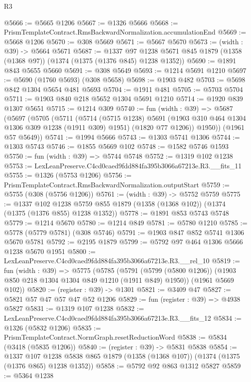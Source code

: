\begin{lexlean}{R3}
\begin{coremodule}
@5666 := @5665 @1206
@5667 := @1326 @5666
@5668 := PrismTemplateContract.RmsBackwardNormalization.accumulationEnd
@5669 := @5668 @1206
@5670 := @308 @5669
@5671 := @5667 @5670
@5673 := (width : @39) -> @5664 @5671
@5687 := @1337
    @97
    @1238
    @5671
    @845
    @1879
    (@1358 (@1368 @97))
    (@1374 (@1375 (@1376 @845) @1238 @1352))
@5690 := @1891 @843 @5655 @5660
@5691 := @308 @5649
@5693 := @1214 @5691 @1210
@5697 := @5690 (@1760 @5693) (@308 @5658)
@5698 := @1903 @482
@5703 := @5698 @842 @1304 @5654 @481 @5693
@5704 := @1911 @481
@5705 := @5703 @5704
@5711 := @1903 @840 @218 @5652 @1304 @5691 @1210
@5714 := @1920 @839 @1307 @5651
@5715 := @1214 @309
@5740 := fun (width : @39) =>
  @5687
    (@5697
      (@5705
        (@5711
          (@5714
            (@5715 @1238)
            @5691
            (@1903 @310 @464 @1304 @1306 @309 @1238 (@1911 @309) @1951)
            (@1820 @77 @1206))
          @1950))
      (@1961 @57 @5649))
@5741 := @1994 @5666
@5743 := @1303 @5741 @1306
@5744 := @1303 @5743
@5746 := @1855 @5669 @102
@5748 := @1582 @5746 @1593
@5750 := fun (width : @39) => @5744 @5748
@5752 := @1319 @102 @1238
@5753 := LexLeanPreserve.C4cd0caed9fdd884fa395b3066a67213e.R3.__fits_11
@5755 := @1326 (@5753 @1206)
@5756 := PrismTemplateContract.RmsBackwardNormalization.outputStart
@5759 := @5755 (@308 (@5756 @1206))
@5761 := (width : @39) -> @5752 @5759
@5775 := @1337
    @102
    @1238
    @5759
    @855
    @1879
    (@1358 (@1368 @102))
    (@1374 (@1375 (@1376 @855) @1238 @1352))
@5778 := @1891 @853 @5743 @5748
@5779 := @1214 @5670
@5780 := @1214 @849
@5781 := @5780 @1210
@5785 := @5778 (@5779 @5781) (@308 @5746)
@5791 := @1903 @847 @852 @5741 @1306 @5670 @5781
@5792 := @2195 @1879
@5799 := @5792 @97 @464 @1306 @5666 @1238 @5670 @1951
@5800 := LexLeanPreserve.C4cd0caed9fdd884fa395b3066a67213e.R3.__rel_10
@5819 := fun (width : @39) =>
  @5775
    (@5785
      (@5791 (@5799 (@5800 @1206)) (@1903 @850 @218 @1304 @1304 @849 @1210 (@1911 @849) @1950))
      (@1961 @5669 @102))
@5820 := (register : @39) -> @1301
@5821 := @3409 @47
@5827 := @5821 @57 @47 @57 @47 @52 @1206
@5829 := fun (register : @39) => @4938 @5827
@5831 := @1319 @107 @1238
@5832 := LexLeanPreserve.C4cd0caed9fdd884fa395b3066a67213e.R3.__fits_12
@5834 := @1326 (@5832 @1206)
@5835 := PrismTemplateContract.NormGraph.resetReductionWord
@5838 := @5834 (@3418 (@5835 @1206))
@5840 := (register : @39) -> @5831 @5838
@5854 := @1337
    @107
    @1238
    @5838
    @865
    @1879
    (@1358 (@1368 @107))
    (@1374 (@1375 (@1376 @865) @1238 @1352))
@5858 := @5792 @92 @863 @1312 @5827
@5859 := @5364 @1238

\end{coremodule}
\end{lexlean}
